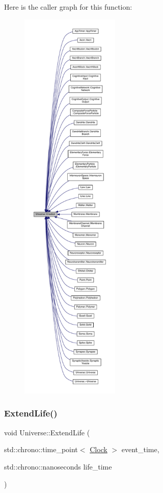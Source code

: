 Here is the caller graph for this function\+:
\nopagebreak
\begin{figure}[H]
\begin{center}
\leavevmode
\includegraphics[height=550pt]{class_universe_a28615baf47d4558cbe5eebeed6575024_icgraph}
\end{center}
\end{figure}
\mbox{\label{class_universe_a982502e46868a00a9111738ccc9355c2}} 
\subsubsection{\texorpdfstring{Extend\+Life()}{ExtendLife()}}
{\footnotesize\ttfamily void Universe\+::\+Extend\+Life (\begin{DoxyParamCaption}\item[{std\+::chrono\+::time\+\_\+point$<$ \hyperlink{universe_8h_a0ef8d951d1ca5ab3cfaf7ab4c7a6fd80}{Clock} $>$}]{event\+\_\+time,  }\item[{std\+::chrono\+::nanoseconds}]{life\+\_\+time }\end{DoxyParamCaption})}




